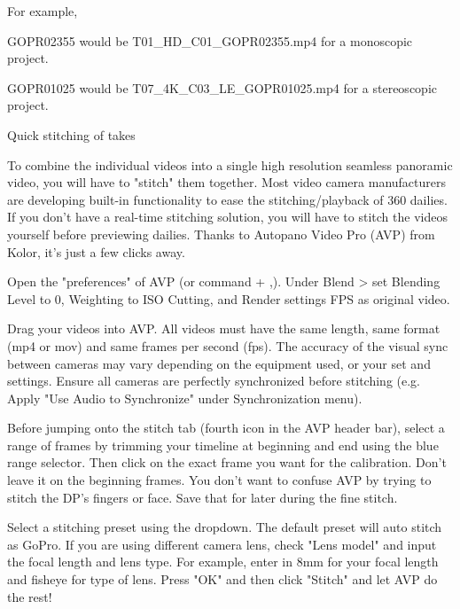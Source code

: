 \begin{fullwidth}
For example,

GOPR02355 would be T01\_HD\_C01\_GOPR02355.mp4 for a monoscopic project.

GOPR01025 would be T07\_4K\_C03\_LE\_GOPR01025.mp4 for a stereoscopic project.

{\large Quick stitching of takes \par}

To combine the individual videos into a single high resolution seamless panoramic video, you will have to "stitch" them together. Most video camera manufacturers are developing built-in functionality to ease the stitching/playback of 360 dailies. If you don't have a real-time stitching solution, you will have to stitch the videos yourself before previewing dailies. Thanks to Autopano Video Pro (AVP) from Kolor, it's just a few clicks away.

Open the "preferences" of AVP (or command + ,). Under Blend > set Blending Level to 0, Weighting to ISO Cutting, and Render settings FPS as original video.


Drag your videos into AVP. All videos must have the same length, same format (mp4 or mov) and same frames per second (fps). The accuracy of the visual sync between cameras may vary depending on the equipment used, or your set and settings. Ensure all cameras are perfectly synchronized before stitching (e.g. Apply "Use Audio to Synchronize" under Synchronization menu).


Before jumping onto the stitch tab (fourth icon in the AVP header bar), select a range of frames by trimming your timeline at beginning and end using the blue range selector. Then click on the exact frame you want for the calibration. Don't leave it on the beginning frames. You don't want to confuse AVP by trying to stitch the DP's fingers or face. Save that for later during the fine stitch. 


Select a stitching preset using the dropdown. The default preset will auto stitch as GoPro. If you are using different camera lens, check "Lens model" and input the focal length and lens type. For example, enter in 8mm for your focal length and fisheye for type of lens. Press "OK" and then click "Stitch" and let AVP do the rest!



\end{fullwidth}
